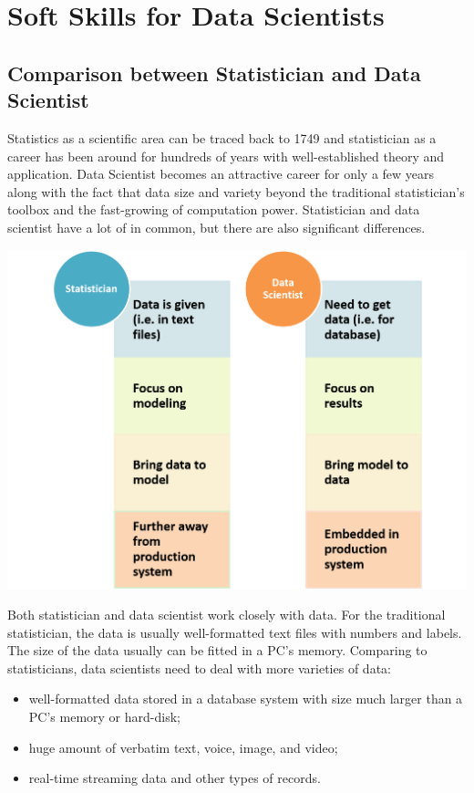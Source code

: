 \documentclass[12pt,]{krantz}
\providecommand{\tightlist}{%
  \setlength{\itemsep}{0pt}\setlength{\parskip}{0pt}}
\theoremstyle{definition}
\theoremstyle{definition}
\theoremstyle{definition}
\theoremstyle{remark}
\begin{document}
\chapter{Soft Skills for Data
Scientists}\label{soft-skills-for-data-scientists}

\section{Comparison between Statistician and Data
Scientist}\label{comparison-between-statistician-and-data-scientist}

Statistics as a scientific area can be traced back to 1749 and
statistician as a career has been around for hundreds of years with
well-established theory and application. Data Scientist becomes an
attractive career for only a few years along with the fact that data
size and variety beyond the traditional statistician's toolbox and the
fast-growing of computation power. Statistician and data scientist have
a lot of in common, but there are also significant differences.

\includegraphics{images/softskill1.png}

Both statistician and data scientist work closely with data. For the
traditional statistician, the data is usually well-formatted text files
with numbers and labels. The size of the data usually can be fitted in a
PC's memory. Comparing to statisticians, data scientists need to deal
with more varieties of data:

\begin{itemize}
\tightlist
\item
  well-formatted data stored in a database system with size much larger
  than a PC's memory or hard-disk;
\item
  huge amount of verbatim text, voice, image, and video;
\item
  real-time streaming data and other types of records.
\end{itemize}
\end{document}

